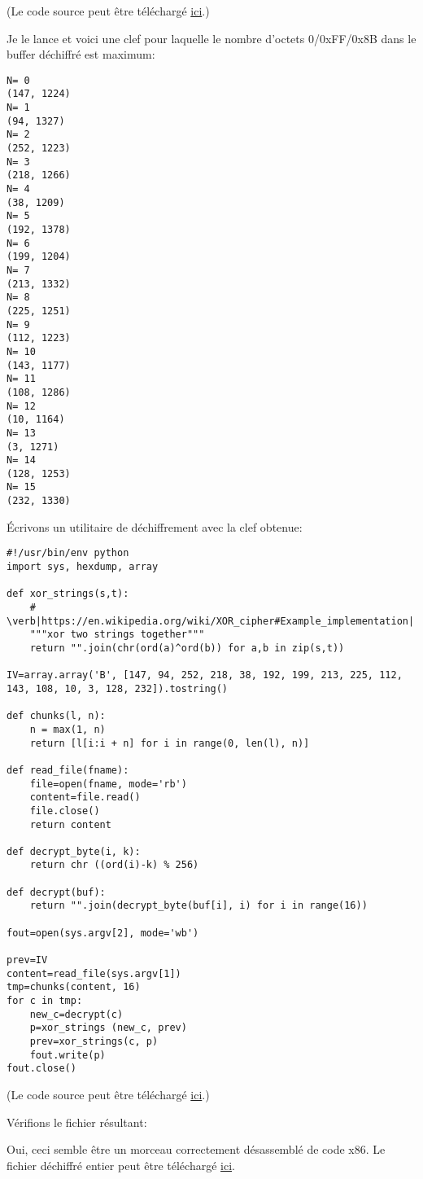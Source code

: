(Le code source peut être téléchargé
\href{\RepoURL/examples/simple_exec_crypto/files/decrypt.py}{ici}.)

Je le lance et voici une clef pour laquelle le nombre d'octets 0/0xFF/0x8B dans le buffer
déchiffré est maximum:

\begin{lstlisting}
N= 0
(147, 1224)
N= 1
(94, 1327)
N= 2
(252, 1223)
N= 3
(218, 1266)
N= 4
(38, 1209)
N= 5
(192, 1378)
N= 6
(199, 1204)
N= 7
(213, 1332)
N= 8
(225, 1251)
N= 9
(112, 1223)
N= 10
(143, 1177)
N= 11
(108, 1286)
N= 12
(10, 1164)
N= 13
(3, 1271)
N= 14
(128, 1253)
N= 15
(232, 1330)
\end{lstlisting}

Écrivons un utilitaire de déchiffrement avec la clef obtenue:

\begin{lstlisting}[style=custompy]
#!/usr/bin/env python
import sys, hexdump, array

def xor_strings(s,t):
    # \verb|https://en.wikipedia.org/wiki/XOR_cipher#Example_implementation|
    """xor two strings together"""
    return "".join(chr(ord(a)^ord(b)) for a,b in zip(s,t))

IV=array.array('B', [147, 94, 252, 218, 38, 192, 199, 213, 225, 112, 143, 108, 10, 3, 128, 232]).tostring()

def chunks(l, n):
    n = max(1, n)
    return [l[i:i + n] for i in range(0, len(l), n)]

def read_file(fname):
    file=open(fname, mode='rb')
    content=file.read()
    file.close()
    return content

def decrypt_byte(i, k):
    return chr ((ord(i)-k) % 256)

def decrypt(buf):
    return "".join(decrypt_byte(buf[i], i) for i in range(16))

fout=open(sys.argv[2], mode='wb')

prev=IV
content=read_file(sys.argv[1])
tmp=chunks(content, 16)
for c in tmp:
    new_c=decrypt(c)
    p=xor_strings (new_c, prev)
    prev=xor_strings(c, p)
    fout.write(p)
fout.close()
\end{lstlisting}

(Le code source peut être téléchargé
\href{\RepoURL/examples/simple_exec_crypto/files/decrypt2.py}
{ici}.)

Vérifions le fichier résultant:



Oui, ceci semble être un morceau correctement désassemblé de code x86.
Le fichier déchiffré entier peut être téléchargé
\href{\RepoURL/examples/simple_exec_crypto/files/decrypted.bin}{ici}.

